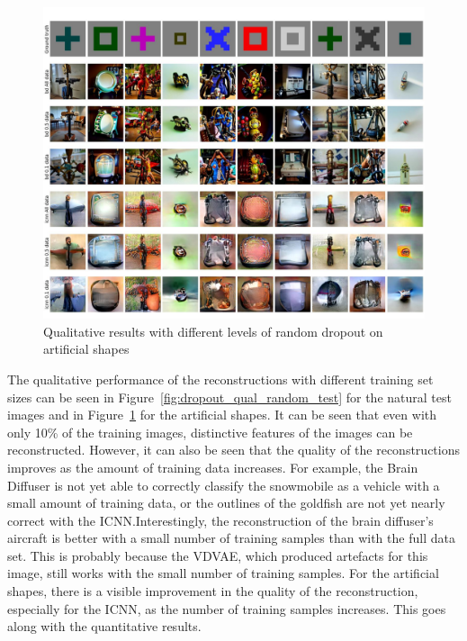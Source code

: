 \begin{figure}[ht]
    \centering
    \includegraphics[width=1\textwidth]{plots/dropout_qual_random_art.JPEG}
    \caption{Qualitative results with different levels of random dropout on artificial shapes}\label{fig:dropout_qual_random_art}
\end{figure}

The qualitative performance of the reconstructions with different training set sizes can be seen in Figure~\ref{fig:dropout_qual_random_test} for the natural test images and in Figure~\ref{fig:dropout_qual_random_art} for the artificial shapes. It can be seen that even with only 10\% of the training images, distinctive features of the images can be reconstructed. However, it can also be seen that the quality of the reconstructions improves as the amount of training data increases. For example, the Brain Diffuser is not yet able to correctly classify the snowmobile as a vehicle with a small amount of training data, or the outlines of the goldfish are not yet nearly correct with the ICNN.\@ Interestingly, the reconstruction of the brain diffuser's aircraft is better with a small number of training samples than with the full data set. This is probably because the VDVAE, which produced artefacts for this image, still works with the small number of training samples. For the artificial shapes, there is a visible improvement in the quality of the reconstruction, especially for the ICNN, as the number of training samples increases. This goes along with the quantitative results.

